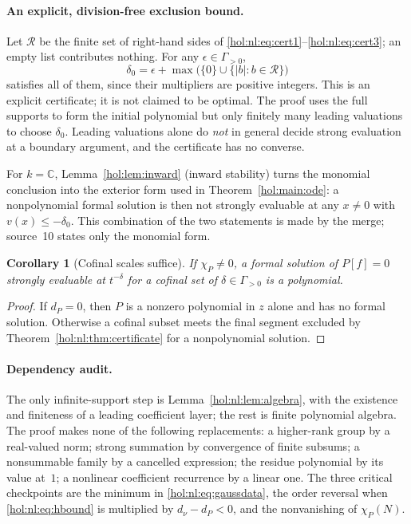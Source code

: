 \documentclass[11pt]{article}
\numberwithin{equation}{section}
\newtheorem{corollary}[theorem]{Corollary}
\theoremstyle{definition}
\theoremstyle{remark}
\newcommand{\C}{\mathbb C}
\newcommand{\abs}[1]{\lvert#1\rvert}
\begin{document}
\paragraph{An explicit, division-free exclusion bound.}
Let $\mathcal R$ be the finite set of right-hand sides of
\eqref{hol:nl:eq:cert1}--\eqref{hol:nl:eq:cert3}; an empty list contributes
nothing. For any $\epsilon\in\Gamma_{>0}$,
\begin{equation}\label{hol:nl:eq:deltazero}
 \delta_0=\epsilon+\max\bigl(\{0\}\cup\{\abs b:b\in\mathcal R\}\bigr)
\end{equation}
satisfies all of them, since their multipliers are positive integers. This is
an explicit certificate; it is not claimed to be optimal. The proof uses the
full supports to form the initial polynomial but only finitely many leading
valuations to choose $\delta_0$. Leading valuations alone do \emph{not} in
general decide strong evaluation at a boundary argument, and the certificate
has no converse.

For $k=\C$, Lemma~\ref{hol:lem:inward} (inward stability) turns the monomial
conclusion into the exterior form used in Theorem~\ref{hol:main:ode}: a
nonpolynomial formal solution is then not strongly evaluable at any
$x\ne0$ with $v(x)\le-\delta_0$. This combination of the two statements is
made by the merge; source~10 states only the monomial form.

\begin{corollary}[Cofinal scales suffice]\label{hol:nl:cor:cofinal}
If $\chi_P\ne0$, a formal solution of $P[f]=0$ strongly evaluable at
$t^{-\delta}$ for a cofinal set of $\delta\in\Gamma_{>0}$ is a polynomial.
\end{corollary}

\begin{proof}
If $d_P=0$, then $P$ is a nonzero polynomial in $z$ alone and has no formal
solution. Otherwise a cofinal subset meets the final segment excluded by
Theorem~\ref{hol:nl:thm:certificate} for a nonpolynomial solution.
\end{proof}

\paragraph{Dependency audit.}
The only infinite-support step is Lemma~\ref{hol:nl:lem:algebra}, with the
existence and finiteness of a leading coefficient layer; the rest is finite
polynomial algebra. The proof makes none of the following replacements: a
higher-rank group by a real-valued norm; strong summation by convergence of
finite subsums; a nonsummable family by a cancelled expression; the residue
polynomial by its value at~$1$; a nonlinear coefficient recurrence by a
linear one. The three critical checkpoints are the minimum in
\eqref{hol:nl:eq:gaussdata}, the order reversal when \eqref{hol:nl:eq:hbound}
is multiplied by $d_\nu-d_P<0$, and the nonvanishing of $\chi_P(N)$.
\end{document}
